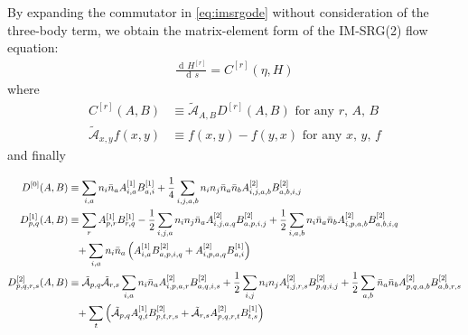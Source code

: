 \documentclass[amsmath, amssymb, aps, floatfix, nofootinbib, preprintnumbers,showpacs, superscriptaddress, twocolumn]{revtex4-1}
\newcommand{\D}{\operatorname{d\!}}
\begin{document}
By expanding the commutator in \eqref{eq:imsrgode} without consideration of the three-body term, we obtain the matrix-element form of the IM-SRG(2) flow equation:
\begin{align}
    \frac{\D H^{[r]}}{\D s} = C^{[r]}(\eta, H) \label{eq:flowmxe}
\end{align}
where
\begin{align}
  C^{[r]}(A, B) &\equiv \tilde{\mathcal{A}}_{A, B} D^{[r]}(A, B) \text{ for any $r$, $A$, $B$} \label{eq:commutmxe} \\
  \tilde{\mathcal{A}}_{x, y} f(x, y) &\equiv f(x, y) - f(y, x) \text{ for any $x$, $y$, $f$}
\end{align}
and finally
\begin{widetext}
  \begin{align}
    D^{[0]}(A, B)
    &\equiv
      \sum_{i, a} n_i \bar{n}_a A^{[1]}_{i, a} B^{[1]}_{a, i}
      + \frac{1}{4} \sum_{i, j, a, b} n_i n_j \bar{n}_a \bar{n}_b A^{[2]}_{i, j, a, b} B^{[2]}_{a, b, i, j}
      \label{eq:flow0} \\
    D^{[1]}_{p, q}(A, B)
    &\equiv
      \sum_{r} A^{[1]}_{p, r} B^{[1]}_{r, q}
      - \frac{1}{2} \sum_{i, j, a} n_i n_j \bar{n}_a A^{[2]}_{i, j, a, q} B^{[2]}_{a, p, i, j}
      + \frac{1}{2} \sum_{i, a, b} n_i \bar{n}_a \bar{n}_b A^{[2]}_{i, p, a, b} B^{[2]}_{a, b, i, q}
      \notag \\
    &\hphantom{=}
      + \sum_{i, a} n_i \bar{n}_a \left(
        A^{[1]}_{i, a} B^{[2]}_{a, p, i, q}
        + A^{[2]}_{i, p, a, q} B^{[1]}_{a, i}
      \right)
      \label{eq:flow1} \\
    D^{[2]}_{p, q, r, s}(A, B)
    &\equiv
      \tilde{\mathcal{A}}_{p, q} \tilde{\mathcal{A}}_{r, s}
        \sum_{i, a} n_i \bar{n}_a A^{[2]}_{i, p, a, r} B^{[2]}_{a, q, i, s}
      + \frac{1}{2} \sum_{i, j} n_i n_j A^{[2]}_{i, j, r, s} B^{[2]}_{p, q, i, j}
      + \frac{1}{2} \sum_{a, b} \bar{n}_a \bar{n}_b A^{[2]}_{p, q, a, b} B^{[2]}_{a, b, r, s}
      \notag \\
    &\hphantom{=}
      + \sum_{t} \left(
        \tilde{\mathcal{A}}_{p, q} A^{[1]}_{q, t} B^{[2]}_{p, t, r, s}
        + \tilde{\mathcal{A}}_{r, s} A^{[2]}_{p, q, r, t} B^{[1]}_{t, s}
      \right)
      \label{eq:flow2}
\end{align}
\end{widetext}
\end{document}
